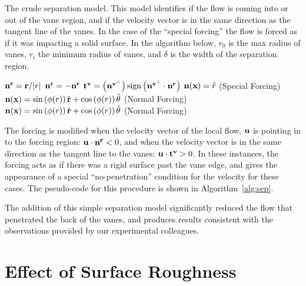 %
%

\begin{center}
 \begin{algorithm}
  \caption{The crude separation model. This model identifies if the flow
  is coming into or out of the vane region, and if the velocity vector
  is in the same direction as the tangent line of the vanes. In the case
  of the ``special forcing'' the flow is forced as if it was
  impacting a solid surface. In the
  algorithm below, $r_0$ is the max radius of vanes, $r_i$ the minimum
  radius of vanes, and $\delta$ is the width of the separation region.}
  \label{alg:sep}
  \begin{algorithmic}
   \STATE ${\bf n^r} = {\bf r}/|r|$
   \STATE ${\bf n^r} = -{\bf n^r}$
   \ENDIF
   \STATE  $\bf t^v = \left( {\bf n^{v^\perp}} \right) \text{sign}\left(
  	    {\bf n^{v^\perp}} \cdot {\bf n^r} \right)$
   \STATE ${\bf n}({\bf x}) = \hat r$ \quad (Special Forcing)
   \ELSE
   \STATE  ${\bf n}({\bf x}) = \sin \left(\phi(r) \right) \hat{{\bf r}}+ \cos
  \left(\phi(r) \right) \hat{{\bf \theta}} $
  \quad (Normal Forcing)
   \ENDIF
   \ELSE
   \STATE ${\bf n}({\bf x}) = \sin \left(\phi(r) \right) \hat{{\bf r}}+ \cos
  \left(\phi(r) \right) \hat{{\bf \theta}} $
  \quad (Normal Forcing)
   \ENDIF
   \ENDIF
  \end{algorithmic}
 \end{algorithm}
\end{center}


The forcing is modified when the velocity vector of the local flow, $\bf
u$ is pointing in to the forcing region: ${\bf u} \cdot {\bf n^r} < 0$, and
when the velocity vector is in the same direction as the tangent line to
the vanes: ${\bf u} \cdot {\bf t^v} > 0 $. In these instances, the
forcing acts as if there was a rigid surface past the vane edge, and
gives the appearance of a special ``no-penetration'' condition for the
velocity for these cases. The pseudo-code for this procedure is shown in
Algorithm~\ref{alg:sep}.

The addition of this simple separation model significantly reduced the
flow that penetrated the back of the vanes, and produces results
consistent with the observations provided by our experimental
colleagues.  

\section{Effect of Surface Roughness}

